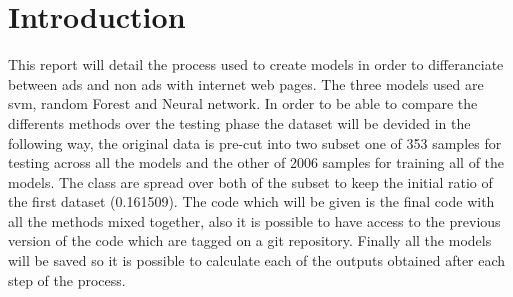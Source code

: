 \chapter{Introduction}

This report will detail the process used to create models in order to differanciate between ads and non ads with internet web pages. The three models used are svm, random Forest and Neural network.
In order to be able to compare the differents methods over the testing phase the dataset will be devided in the following way, the original data is pre-cut into two subset one of 353 samples for testing across all the models and the other of 2006 samples for training all of the models. The class are spread over both of the subset to keep the initial ratio of the first dataset (0.161509). The code which will be given is the final code with all the methods mixed together, also it is possible to have access to the previous version of the code which are tagged on a git repository. Finally all the models will be saved so it is possible to calculate each of the outputs obtained after each step of the process.
